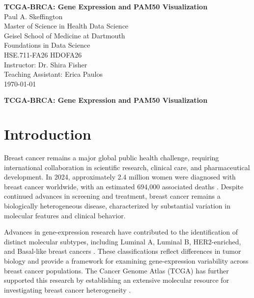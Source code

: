 \documentclass[12pt,letterpaper]{article}
\newcommand{\papertitle}{TCGA-BRCA: Gene Expression and PAM50 Visualization}
\begin{document}
\begin{titlepage}
\thispagestyle{fancy}
\vspace*{1.6in}
\begin{center}
\textbf{\papertitle}\\[2\baselineskip]
Paul A. Skeffington\\
Master of Science in Health Data Science\\
Geisel School of Medicine at Dartmouth\\[\baselineskip]
Foundations in Data Science\\
HSE.711-FA26 \textbar{} HDOFA26\\
Instructor: Dr. Shira Fisher\\
Teaching Assistant: Erica Paulos\\[\baselineskip]
\today
\end{center}
\end{titlepage}
\setcounter{page}{2}
\begin{center}\textbf{\papertitle}\end{center}




\section*{Introduction}

Breast cancer remains a major global public health challenge, requiring international collaboration in scientific research, clinical care, and pharmaceutical development. In 2024, approximately 2.4 million women were diagnosed with breast cancer worldwide, with an estimated 694,000 associated deaths \parencite{who2026breast}. Despite continued advances in screening and treatment, breast cancer remains a biologically heterogeneous disease, characterized by substantial variation in molecular features and clinical behavior.

Advances in gene-expression research have contributed to the identification of distinct molecular subtypes, including Luminal A, Luminal B, HER2-enriched, and Basal-like breast cancers \parencite{parker2009}. These classifications reflect differences in tumor biology and provide a framework for examining gene-expression variability across breast cancer populations. The Cancer Genome Atlas (TCGA) has further supported this research by establishing an extensive molecular resource for investigating breast cancer heterogeneity \parencite{tcga2012}.
\end{document}
